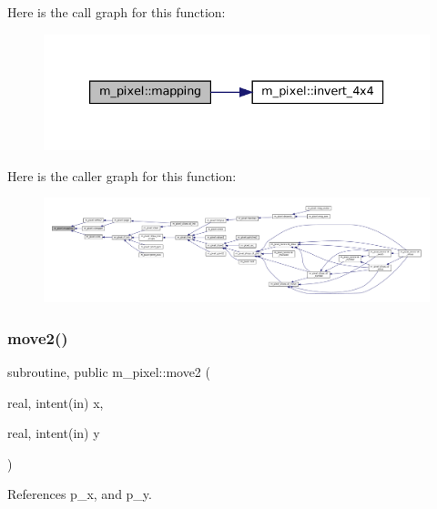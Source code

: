 Here is the call graph for this function\+:
\nopagebreak
\begin{figure}[H]
\begin{center}
\leavevmode
\includegraphics[width=333pt]{namespacem__pixel_a84c841de62fc0addddeff305c4ede9d4_cgraph}
\end{center}
\end{figure}
Here is the caller graph for this function\+:
\nopagebreak
\begin{figure}[H]
\begin{center}
\leavevmode
\includegraphics[width=350pt]{namespacem__pixel_a84c841de62fc0addddeff305c4ede9d4_icgraph}
\end{center}
\end{figure}
\mbox{\label{namespacem__pixel_ab5d4dc474ff84dc0f3f35f4a395979e0}} 
\subsubsection{\texorpdfstring{move2()}{move2()}}
{\footnotesize\ttfamily subroutine, public m\+\_\+pixel\+::move2 (\begin{DoxyParamCaption}\item[{real, intent(in)}]{x,  }\item[{real, intent(in)}]{y }\end{DoxyParamCaption})}



References p\+\_\+x, and p\+\_\+y.

